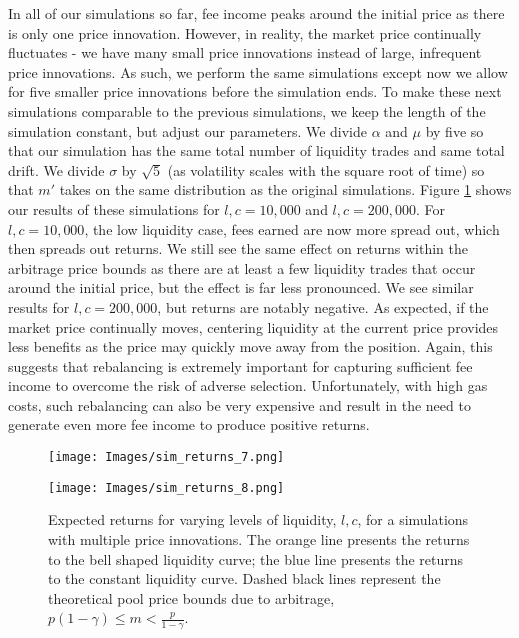 \documentclass[11pt]{article}
\begin{document}
In all of our simulations so far, fee income peaks around the initial price as there is only one price innovation. However, in reality, the market price continually fluctuates - we have many small price innovations instead of large, infrequent price innovations. As such, we perform the same simulations except now we allow for five smaller price innovations before the simulation ends. To make these next simulations comparable to the previous simulations, we keep the length of the simulation constant, but adjust our parameters. We divide $\alpha$ and $\mu$ by five so that our simulation has the same total number of liquidity trades and same total drift. We divide $\sigma$ by $\sqrt{5}$ (as volatility scales with the square root of time) so that $m'$ takes on the same distribution as the original simulations. Figure \ref{fig:sim_returns_7-8} shows our results of these simulations for $l, c = 10,000$ and $l, c = 200,000$. For $l, c = 10,000$, the low liquidity case, fees earned are now more spread out, which then spreads out returns. We still see the same effect on returns within the arbitrage price bounds as there are at least a few liquidity trades that occur around the initial price, but the effect is far less pronounced. We see similar results for $l, c = 200,000$, but returns are notably negative. As expected, if the market price continually moves, centering liquidity at the current price provides less benefits as the price may quickly move away from the position. Again, this suggests that rebalancing is extremely important for capturing sufficient fee income to overcome the risk of adverse selection. Unfortunately, with high gas costs, such rebalancing can also be very expensive and result in the need to generate even more fee income to produce positive returns.

\begin{figure}[H]
    \centering
    \begin{minipage}[b]{\textwidth}
        \texttt{[image: Images/sim\_returns\_7.png]}
    \end{minipage}
    \begin{minipage}[b]{\textwidth}
        \texttt{[image: Images/sim\_returns\_8.png]}
    \end{minipage}
    \caption{Expected returns for varying levels of liquidity, $l, c$, for a simulations with multiple price innovations. The orange line presents the returns to the bell shaped liquidity curve; the blue line presents the returns to the constant liquidity curve. Dashed black lines represent the theoretical pool price bounds due to arbitrage, $p (1 - \gamma) \le m < \frac{p}{1 - \gamma}$.}
    \label{fig:sim_returns_7-8}
\end{figure}
\end{document}
